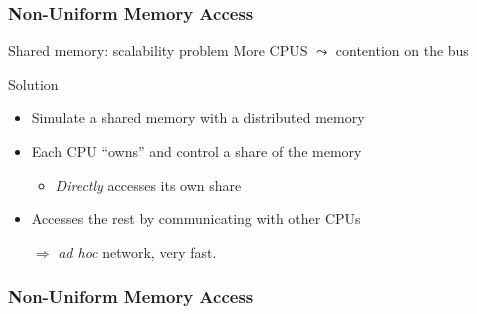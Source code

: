\documentclass[xcolor={x11names,svgnames,psnames}]{beamer}
\begin{document}
  
  
  



\begin{frame}
  \frametitle{Non-Uniform Memory Access}

  \begin{alertblock}{Shared memory: scalability problem}
    More CPUS $\leadsto$ contention on the bus
  \end{alertblock}

  \begin{exampleblock}{Solution}
    \begin{itemize}
    \item Simulate a shared memory with a distributed memory
    \item Each CPU ``owns'' and control a share of the memory
      \begin{itemize}
      \item \emph{Directly} accesses its own share 
      \end{itemize}
    \item Accesses the rest by communicating with other CPUs
    \item[$\Rightarrow$] \textit{ad hoc} network, very fast.
    \end{itemize}
  \end{exampleblock}
\end{frame}

\begin{frame}
  \frametitle{Non-Uniform Memory Access}
\end{frame}
\end{document}

